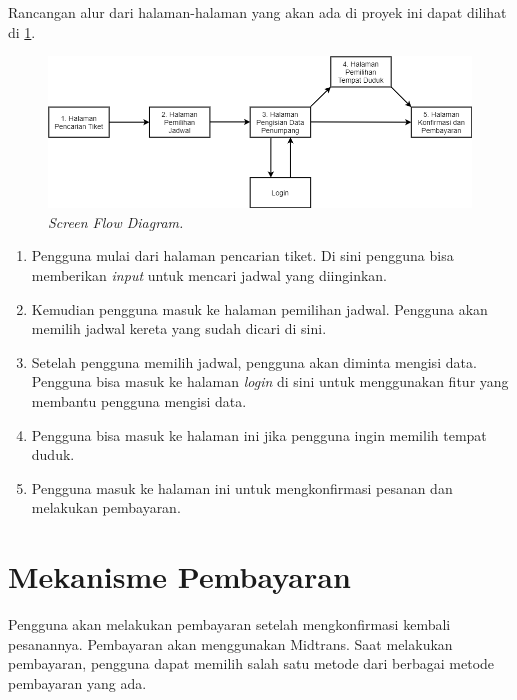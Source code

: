 Rancangan alur dari halaman-halaman yang akan ada di proyek ini dapat dilihat di \ref{img:screenflowdiagram}. 

\begin{figure}[H]
\center
\includegraphics[width=\textwidth,height=\textheight,keepaspectratio]{Gambar/Screen Flow Diagram.png}
\caption{\textit{Screen Flow Diagram.}}
    \label{img:screenflowdiagram}
\end{figure}

\begin{enumerate}
    \item Pengguna mulai dari halaman pencarian tiket. Di sini pengguna bisa memberikan \textit{input} untuk mencari jadwal yang diinginkan.
    \item Kemudian pengguna masuk ke halaman pemilihan jadwal. Pengguna akan memilih jadwal kereta yang sudah dicari di sini.
    \item Setelah pengguna memilih jadwal, pengguna akan diminta mengisi data. Pengguna bisa masuk ke halaman \textit{login} di sini untuk menggunakan fitur yang membantu pengguna mengisi data.
    \item Pengguna bisa masuk ke halaman ini jika pengguna ingin memilih tempat duduk.
    \item Pengguna masuk ke halaman ini untuk mengkonfirmasi pesanan dan melakukan pembayaran.
\end{enumerate}  

\section{Mekanisme Pembayaran}
\label{sec:mekanismepembayaran}

Pengguna akan melakukan pembayaran setelah mengkonfirmasi kembali pesanannya. Pembayaran akan menggunakan Midtrans. Saat melakukan pembayaran, pengguna dapat memilih salah satu metode dari berbagai metode pembayaran yang ada. 

